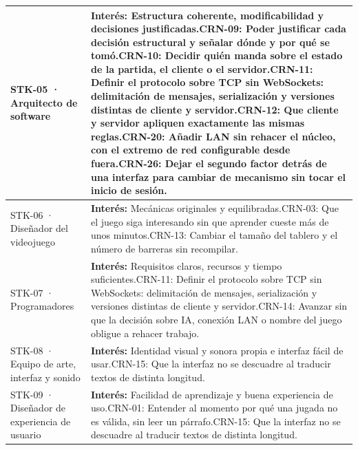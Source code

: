 \documentclass[11pt,letterpaper]{article}
\begin{document}
\begin{xltabular}{\linewidth}{|>{\raggedright\arraybackslash}p{4.2cm}|Y|}
  STK-05 · Arquitecto de software & \textbf{Interés:} Estructura coherente, modificabilidad y decisiones justificadas.\newline CRN-09: Poder justificar cada decisión estructural y señalar dónde y por qué se tomó.\newline CRN-10: Decidir quién manda sobre el estado de la partida, el cliente o el servidor.\newline CRN-11: Definir el protocolo sobre TCP sin WebSockets: delimitación de mensajes, serialización y versiones distintas de cliente y servidor.\newline CRN-12: Que cliente y servidor apliquen exactamente las mismas reglas.\newline CRN-20: Añadir LAN sin rehacer el núcleo, con el extremo de red configurable desde fuera.\newline CRN-26: Dejar el segundo factor detrás de una interfaz para cambiar de mecanismo sin tocar el inicio de sesión.\\\hline
  STK-06 · Diseñador del videojuego & \textbf{Interés:} Mecánicas originales y equilibradas.\newline CRN-03: Que el juego siga interesando sin que aprender cueste más de unos minutos.\newline CRN-13: Cambiar el tamaño del tablero y el número de barreras sin recompilar.\\\hline
  STK-07 · Programadores & \textbf{Interés:} Requisitos claros, recursos y tiempo suficientes.\newline CRN-11: Definir el protocolo sobre TCP sin WebSockets: delimitación de mensajes, serialización y versiones distintas de cliente y servidor.\newline CRN-14: Avanzar sin que la decisión sobre IA, conexión LAN o nombre del juego obligue a rehacer trabajo.\\\hline
  STK-08 · Equipo de arte, interfaz y sonido & \textbf{Interés:} Identidad visual y sonora propia e interfaz fácil de usar.\newline CRN-15: Que la interfaz no se descuadre al traducir textos de distinta longitud.\\\hline
  STK-09 · Diseñador de experiencia de usuario & \textbf{Interés:} Facilidad de aprendizaje y buena experiencia de uso.\newline CRN-01: Entender al momento por qué una jugada no es válida, sin leer un párrafo.\newline CRN-15: Que la interfaz no se descuadre al traducir textos de distinta longitud.\\\hline

\end{xltabular}
\end{document}
